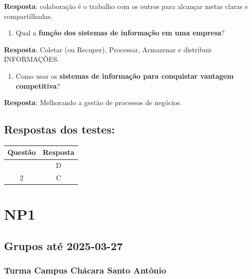 \documentclass[
]{book}
\providecommand{\tightlist}{%
  \setlength{\itemsep}{0pt}\setlength{\parskip}{0pt}}
\begin{document}
\textbf{Resposta}: colaboração é o trabalho com os outros para alcançar metas claras e compartilhadas.

\begin{enumerate}
\def\labelenumi{\arabic{enumi}.}
\setcounter{enumi}{11}
\tightlist
\item
  Qual a \textbf{função dos sistemas de informação em uma empresa}?
\end{enumerate}

\textbf{Resposta}: Coletar (ou Recuper), Processar, Armazenar e distribuir INFORMAÇÕES.

\begin{enumerate}
\def\labelenumi{\arabic{enumi}.}
\setcounter{enumi}{12}
\tightlist
\item
  Como usar os \textbf{sistemas de informação para conquistar vantagem competitiva}?
\end{enumerate}

\textbf{Resposta}: Melhorando a gestão de processos de negócios.

\section{Respostas dos testes:}\label{respostas-dos-testes}

\begin{longtable}[]{@{}cc@{}}
\toprule\noalign{}
Questão & Resposta \\
\midrule\noalign{}
\endhead
\bottomrule\noalign{}
\endlastfoot
1 & D \\
2 & C \\
\end{longtable}

\chapter{NP1}\label{np1}

\section{Grupos até 2025-03-27}\label{grupos-atuxe9-2025-03-27}

\subsection{Turma Campus Chácara Santo Antônio}\label{turma-campus-chuxe1cara-santo-antuxf4nio}
\end{document}
